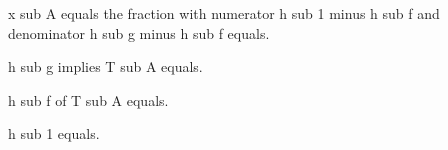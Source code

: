 x sub A equals the fraction with numerator h sub 1 minus h sub f and denominator h sub g minus h sub f equals.

h sub g implies T sub A equals.

h sub f of T sub A equals.

h sub 1 equals.